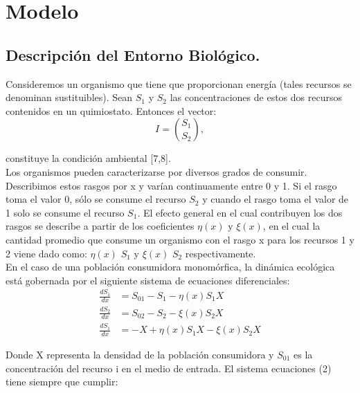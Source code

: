 \documentclass[letterpaper]{article}
\begin{document}
    \section{Modelo}{

        \subsection{Descripción del Entorno Biológico.}
        
        
        \normalsize{Consideremos un organismo que tiene que proporcionan energía (tales recursos se denominan sustituibles). Sean $S_1$ y $S_2$ las concentraciones de estos dos recursos contenidos en un quimiostato. Entonces el vector:}\\
        
        \begin{equation}
        I=\binom{S_{1}}{S_{2}},
        \end{equation}

        \normalsize{constituye la condición ambiental [7,8].}\\

        \normalsize{Los organismos pueden caracterizarse por diversos grados de consumir. Describimos estos rasgos por x y varían continuamente entre 0 y 1. Si el rasgo toma el valor 0, sólo se consume el recurso $S_2$ y cuando el rasgo toma el valor de 1 solo se consume el recurso $S_1$. El efecto general en el cual contribuyen los dos rasgos se describe a partir de los coeficientes $\eta(x)$  y $\xi(x)$, en el cual la cantidad promedio que consume un organismo con el rasgo x para los recursos 1 y 2 viene dado como:  $\eta(x)$ $S_1$ y $\xi(x)$ $S_2$ respectivamente.}\\

        \normalsize{En el caso de una población consumidora monomórfica, la dinámica ecológica está gobernada por el siguiente sistema de ecuaciones diferenciales:}\\

        \begin{equation}
        \begin{split}
             \frac{d S_1}{dx}&=S_{01}-S_1-\eta(x)S_1X\\  \frac{d S_2}{dx}&=S_{02}-S_2-\xi(x)S_2X\\ \frac{d S_1}{dx}&=-X+\eta(x)S_1X-\xi(x)S_2X 
        \end{split}
        \end{equation}

        \normalsize{Donde X representa la densidad de la población consumidora y $S_{01}$ es la concentración del recurso i en el medio de entrada.
        El sistema ecuaciones (2) tiene siempre que cumplir:}\\

}
\end{document}
